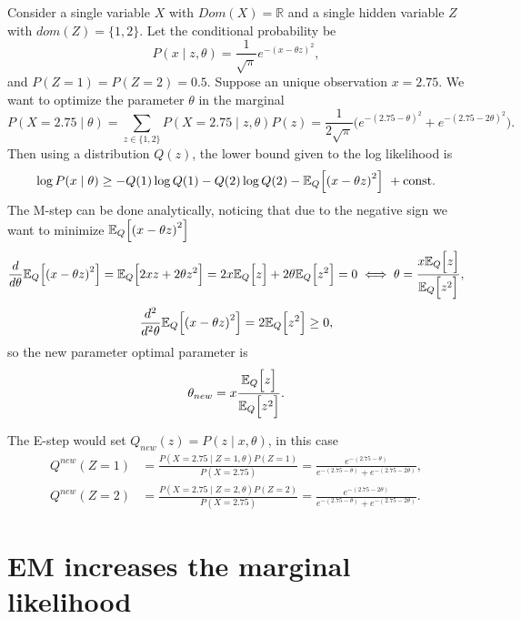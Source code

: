 \begin{exampleth}
  Consider a single variable \(X\) with \(Dom(X) = \mathbb{R}\) and a single hidden variable \(Z\) with \(dom(Z) = \{1,2\}\). Let the conditional probability be
  \[
    P(x \mid z, \theta) = \frac{1}{\sqrt{\pi}}e^{{-(x - \theta z)}^{2}},
  \]
  and \(P(Z = 1) = P(Z = 2) = 0.5\). Suppose an unique observation \(x = 2.75\). We want to optimize the parameter \(\theta\) in the marginal
  \[
    P(X = 2.75 \mid \theta) = \sum_{z \in \{1,2\}} P(X = 2.75 \mid z, \theta) P(z) = \frac{1}{2\sqrt{\pi}}\big( e^{{-(2.75 - \theta)}^{2}} + e^{{-(2.75 - 2\theta)}^{2}} \big).
  \]
  Then using a distribution \(Q(z)\), the lower bound given to the log likelihood is
  \[
    \log{P(x \mid \theta)} \geq -Q(1)\log{Q(1)} - Q(2)\log{Q(2)} - \mathbb{E}_{Q}\Big[{(x - \theta z)}^{2}\Big]\ + \text{const.}
  \]
  The M-step can be done analytically, noticing that due to the negative sign we want to minimize \(\mathbb{E}_{Q}\Big[{(x - \theta z)}^{2}\Big]\)
  \[
    \frac{d}{d\theta}\mathbb{E}_{Q}\Big[{(x - \theta z)}^{2}\Big] = \mathbb{E}_{Q}\Big[ 2 x z + 2\theta z^{2} \Big] = 2x\mathbb{E}_{Q}\Big[z\Big] + 2\theta \mathbb{E}_{Q}\Big[z^{2}\Big] = 0 \iff \theta = \frac{x\mathbb{E}_{Q}\Big[z\Big]}{\mathbb{E}_{Q}\Big[z^{2}\Big]},
  \]
  \[
    \frac{d^{2}}{d^{2}\theta}\mathbb{E}_{Q}\Big[{(x - \theta z)}^{2}\Big] = 2\mathbb{E}_{Q}\Big[z^{2}\Big] \geq 0,
  \]
  so the new parameter optimal parameter is
  \[
    \theta_{new} = x \frac{\mathbb{E}_{Q}\Big[z\Big]}{\mathbb{E}_{Q}\Big[z^{2}\Big]}.
  \]

  The E-step would set \(Q_{new}(z) = P(z \mid x , \theta)\), in this case
  \[
    \begin{aligned}
      Q^{new}(Z = 1) &= \frac{P(X = 2.75 \mid Z = 1, \theta)P(Z = 1)}{P(X = 2.75)} = \frac{e^{-(2.75-\theta)}}{ e^{-(2.75-\theta)} + e^{-(2.75-2\theta)}  },\\
      Q^{new}(Z = 2) &= \frac{P(X = 2.75 \mid Z = 2, \theta)P(Z = 2)}{P(X = 2.75)} = \frac{e^{-(2.75-2\theta)}}{ e^{-(2.75-\theta)} + e^{-(2.75-2\theta)}  }.
    \end{aligned}
  \]
\end{exampleth}



\section{EM increases the marginal likelihood}

